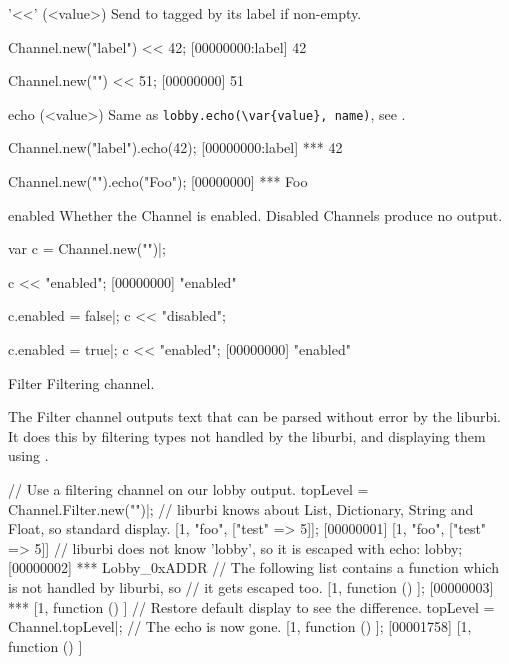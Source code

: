 \begin{urbiscriptapi}
\item['<<'](<value>)%
  Send  to \this tagged by its label if non-empty.

\begin{urbiscript}
Channel.new("label") << 42;
[00000000:label] 42

Channel.new("") << 51;
[00000000] 51
\end{urbiscript}


\item[echo](<value>)%
  Same as \lstinline|lobby.echo(\var{value}, name)|, see
  .

\begin{urbiscript}
Channel.new("label").echo(42);
[00000000:label] *** 42

Channel.new("").echo("Foo");
[00000000] *** Foo
\end{urbiscript}


\item[enabled] Whether the Channel is enabled.  Disabled Channels
  produce no output.
\begin{urbiscript}
var c = Channel.new("")|;

c << "enabled";
[00000000] "enabled"

c.enabled = false|;
c << "disabled";

c.enabled = true|;
c << "enabled";
[00000000] "enabled"
\end{urbiscript}


\item[Filter] Filtering channel.

The Filter channel outputs text that can be parsed without error by the liburbi.
It does this by filtering types not handled by the liburbi, and displaying
them using .

\begin{urbiscript}
// Use a filtering channel on our lobby output.
topLevel = Channel.Filter.new("")|;
// liburbi knows about List, Dictionary, String and Float, so standard display.
[1, "foo", ["test" => 5]];
[00000001] [1, "foo", ["test" => 5]]
// liburbi does not know 'lobby', so it is escaped with echo:
lobby;
[00000002] *** Lobby_0xADDR
// The following list contains a function which is not handled by liburbi, so
// it gets escaped too.
[1, function () {}];
[00000003] *** [1, function () {}]
// Restore default display to see the difference.
topLevel = Channel.topLevel|;
// The echo is now gone.
[1, function () {}];
[00001758] [1, function () {}]
\end{urbiscript}



\end{urbiscriptapi}
